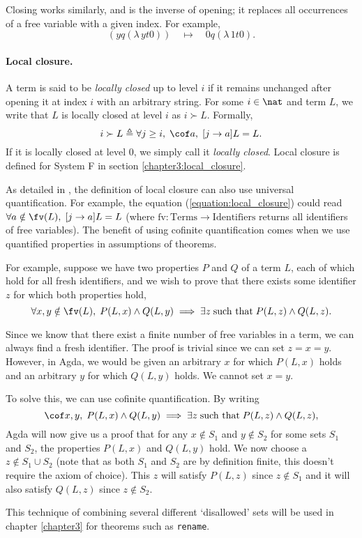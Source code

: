 Closing works similarly, and is the inverse of opening; it replaces all occurrences of a free
variable with a given index. For example,
\begin{equation*}
  [0 \leftarrow y] (y q (\lambda \, y t 0)) \quad \mapsto \quad 0 q (\lambda \, 1 t 0).
\end{equation*}

\paragraph*{Local closure.} A term is said to be \textit{locally closed} up to level $i$ if it
remains unchanged after opening it at index $i$ with an arbitrary string. For some $i \in \nat$ and
term $L$, we write that $L$ is locally closed at level $i$ as $i \succ L$. Formally,
\begin{equation}
  \label{equation:local_closure}
  i \succ L \triangleq \forall j \geq i, \; \cof a , \; [j \to a] L = L.
\end{equation}
If it is locally closed at level $0$, we simply call it \textit{locally closed}. Local closure is
defined for System F in section \ref{chapter3:local_closure}.

As detailed in \citet{aydemir_engineering_2008}, the definition of local closure can also use
universal quantification. For example, the equation (\ref{equation:local_closure}) could read
$\forall a \notin \fv(L), \; [j \to a] L = L$ (where $\text{fv} \colon \text{Terms} \to
\text{Identifiers}$ returns all identifiers of free variables). The benefit of using cofinite
quantification comes when we use quantified properties in assumptions of theorems.

For example, suppose we have two properties $P$ and $Q$ of a term $L$, each of which hold for all
fresh identifiers, and we wish to prove that there exists some identifier $z$ for which both
properties hold,
\begin{equation*}
  \forall x, y \notin \fv(L), \; P(L, x) \wedge Q(L, y)
    \implies \exists z \; \text{such that} \; P(L, z) \wedge Q(L, z).
\end{equation*}

Since we know that there exist a finite number of free variables in a term, we can always find a
fresh identifier. The proof is trivial since we can set $z = x = y$. However, in Agda, we would be
given an arbitrary $x$ for which $P(L, x)$ holds and an arbitrary $y$ for which $Q(L, y)$ holds. We
cannot set $x = y$.

To solve this, we can use cofinite quantification. By writing
\begin{equation*}
  \cof x, y, \; P(L, x) \wedge Q(L, y)
  \implies \exists z \; \text{such that} \; P(L, z) \wedge Q(L, z),
\end{equation*}
Agda will now give us a proof that for any $x \notin S_1$ and $y \notin S_2$ for some sets $S_1$ and
$S_2$, the properties $P(L, x)$ and $Q(L, y)$ hold. We now choose a $z \notin S_1 \cup
S_2$ (note that as both $S_1$ and $S_2$ are by definition finite, this doesn't require the
axiom of choice). This $z$ will satisfy $P(L, z)$ since $z \notin S_1$ and it will also satisfy
$Q(L, z)$ since $z \notin S_2$.

This technique of combining several different `disallowed' sets will be used in chapter
\ref{chapter3} for theorems such as \texttt{rename}.